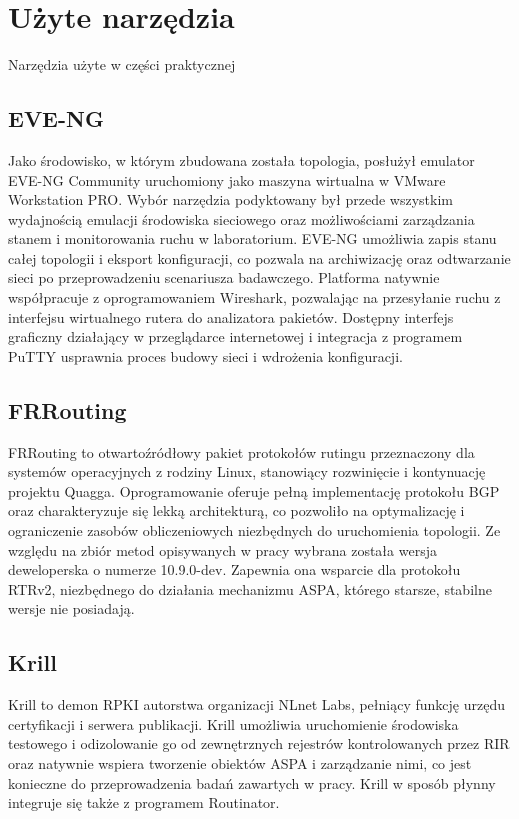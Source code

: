 \chapter{Użyte narzędzia}
\label{chapter-3}

Narzędzia użyte w części praktycznej

\section{EVE-NG}

Jako środowisko, w którym zbudowana została topologia, posłużył emulator EVE-NG Community uruchomiony jako maszyna wirtualna w VMware Workstation PRO. Wybór narzędzia podyktowany był przede wszystkim wydajnością emulacji środowiska sieciowego oraz możliwościami zarządzania stanem i monitorowania ruchu w laboratorium. EVE-NG umożliwia zapis stanu całej topologii i eksport konfiguracji, co pozwala na archiwizację oraz odtwarzanie sieci po przeprowadzeniu scenariusza badawczego. Platforma natywnie współpracuje z oprogramowaniem Wireshark, pozwalając na przesyłanie ruchu z interfejsu wirtualnego rutera do analizatora pakietów. Dostępny interfejs graficzny działający w przeglądarce internetowej i integracja z programem PuTTY usprawnia proces budowy sieci i wdrożenia konfiguracji.

\section{FRRouting}

FRRouting to otwartoźródłowy pakiet protokołów rutingu przeznaczony dla systemów operacyjnych z rodziny Linux, stanowiący rozwinięcie i kontynuację projektu Quagga. Oprogramowanie oferuje pełną implementację protokołu BGP oraz charakteryzuje się lekką architekturą, co pozwoliło na optymalizację i ograniczenie zasobów obliczeniowych niezbędnych do uruchomienia topologii. Ze względu na zbiór metod opisywanych w pracy wybrana została wersja deweloperska o numerze 10.9.0-dev. Zapewnia ona wsparcie dla protokołu RTRv2, niezbędnego do działania mechanizmu ASPA, którego starsze, stabilne wersje nie posiadają.

\section{Krill}

Krill to demon RPKI autorstwa organizacji NLnet Labs, pełniący funkcję urzędu certyfikacji i serwera publikacji. Krill umożliwia uruchomienie środowiska testowego i odizolowanie go od zewnętrznych rejestrów kontrolowanych przez RIR oraz natywnie wspiera tworzenie obiektów ASPA i zarządzanie nimi, co jest konieczne do przeprowadzenia badań zawartych w pracy. Krill w sposób płynny integruje się także z programem Routinator.

